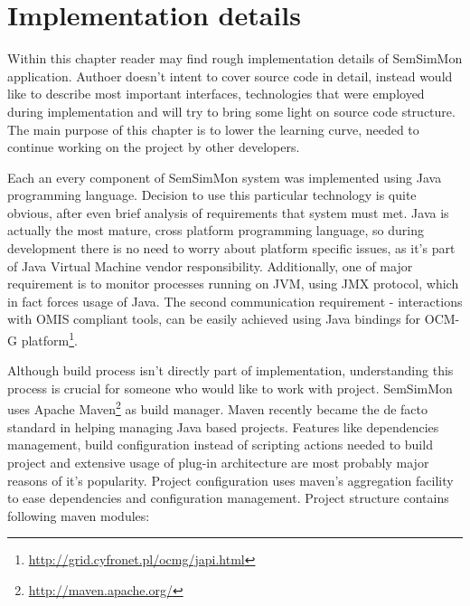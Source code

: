  
%


\chapter{Implementation details}
\label{cha:implementation}

Within this chapter reader may find rough implementation details of SemSimMon application. Authoer doesn\rq{}t intent to cover
source code in detail, instead would like to describe most important interfaces, technologies  that were
employed during implementation and will try to bring some light on source code structure. The main purpose of this chapter is to lower the learning curve, needed to continue working on the project by other developers.

Each an every component of SemSimMon system was implemented using Java programming language. Decision to use this
particular technology is quite obvious, after even brief analysis of requirements that system must met. Java is
actually the most mature, cross platform programming language, so during development there is no need to worry about
platform specific issues, as it's part of Java Virtual Machine vendor responsibility. Additionally, one of major
requirement is to monitor processes running on JVM, using JMX protocol, which in fact forces usage of Java. The second communication
requirement - interactions with OMIS compliant tools, can be easily achieved using Java bindings for OCM-G
platform\footnote{\url{http://grid.cyfronet.pl/ocmg/japi.html}}.  

Although build process isn't directly part of implementation, understanding this process is crucial for someone
who would like to work with project. SemSimMon uses Apache Maven\footnote{\url{http://maven.apache.org/}} as build
manager. Maven recently became the de facto standard in helping managing Java based projects. Features like dependencies
management, build configuration instead of scripting actions needed to build project and extensive usage of plug-in
architecture are most probably major reasons of it\rq{}s popularity. Project configuration uses maven's aggregation facility to ease dependencies and configuration management. Project structure contains following maven modules:
 
